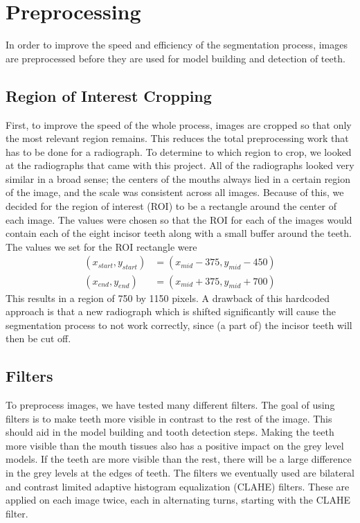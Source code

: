 \documentclass[a4paper]{article}
\begin{document}
\section{Preprocessing}
\label{sect:preprocessing}
In order to improve the speed and efficiency of the segmentation process, images are preprocessed before they are used for model building and detection of teeth.

\subsection{Region of Interest Cropping}
First, to improve the speed of the whole process, images are cropped so that only the most relevant region remains.
This reduces the total preprocessing work that has to be done for a radiograph.
To determine to which region to crop, we looked at the radiographs that came with this project.
All of the radiographs looked very similar in a broad sense; the centers of the mouths always lied in a certain region of the image, and the scale was consistent across all images.
Because of this, we decided for the region of interest (ROI) to be a rectangle around the center of each image.
The values were chosen so that the ROI for each of the images would contain each of the eight incisor teeth along with a small buffer around the teeth.
The values we set for the ROI rectangle were 
\begin{align} 
(x_{start}, y_{start}) &= (x_{mid} - 375, y_{mid} - 450) \\ 
(x_{end}, y_{end})     &= (x_{mid} + 375, y_{mid} + 700)
\end{align}
This results in a region of 750 by 1150 pixels.
A drawback of this hardcoded approach is that a new radiograph which is shifted significantly will cause the segmentation process to not work correctly, since (a part of) the incisor teeth will then be cut off.

\subsection{Filters}
To preprocess images, we have tested many different filters.
The goal of using filters is to make teeth more visible in contrast to the rest of the image.
This should aid in the model building and tooth detection steps.
Making the teeth more visible than the mouth tissues also has a positive impact on the grey level models.
If the teeth are more visible than the rest, there will be a large difference in the grey levels at the edges of teeth.
The filters we eventually used are bilateral and contrast limited adaptive histogram equalization (CLAHE) filters.
These are applied on each image twice, each in alternating turns, starting with the CLAHE filter.
\bigskip 
\end{document}
